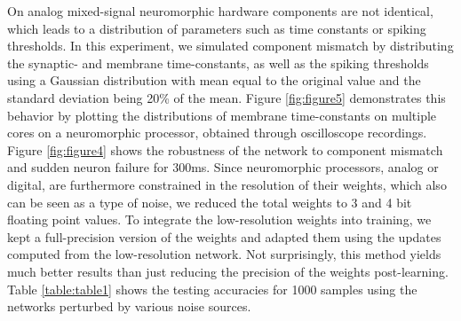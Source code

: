 \documentclass[twoside,11pt,titlepage]{article}
\begin{document}
On analog mixed-signal neuromorphic hardware components are not identical, which leads to a distribution
of parameters such as time constants or spiking thresholds. In this experiment, we simulated component mismatch by
distributing the synaptic- and membrane time-constants, as well as the spiking thresholds using a Gaussian distribution with mean
equal to the original value and the standard deviation being 20\% of the mean. Figure \ref{fig:figure5} demonstrates this behavior by plotting
the distributions of membrane time-constants on multiple cores on a neuromorphic processor, obtained through oscilloscope recordings.
Figure \ref{fig:figure4} shows the robustness of the network to component mismatch and sudden neuron failure for 300ms. Since neuromorphic
processors, analog or digital, are furthermore constrained in the resolution of their weights, which also can be seen as a type of noise,
we reduced the total weights to 3 and 4 bit floating point values. To integrate the low-resolution weights into training, we kept a
full-precision version of the weights and adapted them using the updates computed from the low-resolution network. Not surprisingly,
this method yields much better results than just reducing the precision of the weights post-learning. Table \ref{table:table1} shows the
testing accuracies for 1000 samples using the networks perturbed by various noise sources.
\end{document}
